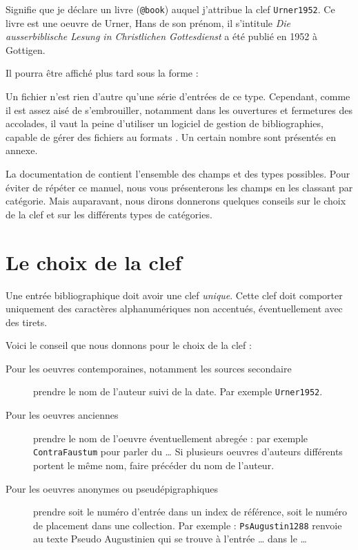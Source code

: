 Signifie que je déclare un livre (\verb|@book|) auquel j'attribue la clef \verb|Urner1952|. Ce livre est une oeuvre de Urner, Hans de son prénom, il s'intitule \emph{Die ausserbiblische Lesung in Christlichen Gottesdienst} a été publié en 1952 à Gottigen.


Il pourra être affiché plus tard sous la forme :

\begin{quote}
\cite{Urner1952}
\end{quote}



Un fichier  n'est rien d'autre qu'une  série d'entrées de ce type. Cependant, comme il est assez aisé de s'embrouiller, notamment dans les ouvertures et fermetures des accolades, il vaut la peine d'utiliser un logiciel de gestion de bibliographies, capable de gérer  des fichiers au formats . Un certain nombre sont présentés en annexe.

La documentation de  contient l'ensemble des champs et des types possibles. Pour éviter de répéter ce manuel, nous vous présenterons les champs en les classant par catégorie. Mais auparavant, nous dirons donnerons quelques conseils sur le choix de la clef et sur les différents types de catégories.

\section{Le choix de la clef}

Une entrée bibliographique doit avoir une clef \emph{unique}. Cette clef doit comporter uniquement des caractères alphanumériques non accentués, éventuellement avec des tirets. 

Voici le conseil que nous donnons pour le choix de la clef :
\begin{description}
\item[Pour les oeuvres contemporaines, notamment les sources secondaire] prendre le nom de l'auteur suivi de la date. Par exemple \verb|Urner1952|.
\item[Pour les oeuvres anciennes] prendre le nom de l'oeuvre  éventuellement abregée : par exemple \verb|ContraFaustum| pour parler du … Si plusieurs oeuvres d'auteurs différents portent le même nom, faire précéder du nom de l'auteur.
\item[Pour les oeuvres anonymes ou pseudépigraphiques] prendre soit le numéro d'entrée dans un index de référence, soit le numéro de placement dans une collection. Par exemple : \verb|PsAugustin1288| renvoie au texte Pseudo Augustinien qui se trouve à l'entrée … dans le …
\end{description}


